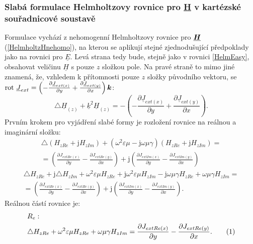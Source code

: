 \documentclass[12pt,a4paper,oneside]{article}
\numberwithin{equation}{section} %
\numberwithin{figure}{section} %
\numberwithin{table}{section} %
\newcommand{\mj}{\mathrm{j}} %
\renewcommand{\vec}[1]{\mbox{\boldmath$#1$}} %
\newcommand{\faz}[1]{{\underline{#1}}} %
\newcommand{\rot}{\mathrm{rot}\ }
\newcommand\numberthis{\addtocounter{equation}{1}\tag{\theequation}}
\begin{document}
\subsubsection{Slabá formulace Helmholtzovy rovnice pro \faz{H} v kartézské souřadnicové soustavě}
Formulace vychází z nehomogenní Helmholtzovy rovnice pro $\faz{\vec{H}}$ (\ref{HelmholtzHnehomo}), na kterou se aplikují stejné zjednodušující předpoklady jako na rovnici pro $\faz{E}$. Levá strana tedy bude, stejně jako v rovnici \ref{HelmEasy}, obsahovat veličinu $\faz{H}$ s pouze $z$ složkou pole. Na pravé straně to mimo jiné znamená, že, vzhledem k přítomnosti pouze $z$ složky původního vektoru, se $\rot \faz{J} _{ext} = \left( - \frac{\partial \faz{J} _{ext(x)}}{\partial y} + \frac{\partial \faz{J} _{ext(y)}}{\partial x} \right) \vec{k}$:
\begin{equation}
\label{HelmEasyH}
\triangle \faz{H} _{(z)} + \faz{k} ^2 \faz{H} _{(z)} = - \left( - \frac{\partial \faz{J} _{ext(x)}}{\partial y} + \frac{\partial \faz{J} _{ext(y)}}{\partial x} \right) .
\end{equation}
Prvním krokem pro vyjádření slabé formy je rozložení rovnice na reálnou a imaginární složku:
\begin{equation}
\begin{split}
\triangle (H _{zRe} + \mj H _{zIm}) + (\omega ^2 \varepsilon \mu - \mj \omega \mu \gamma) (H _{zRe} + \mj H _{zIm}) =\\ 
= \left( \frac{\partial J _{extRe(x)}}{\partial y} - \frac{\partial J _{extRe(y)}}{\partial x} \right) + \mj \left( \frac{\partial J _{extIm(x)}}{\partial y} - \frac{\partial J _{extIm(y)}}{\partial x} \right)
\end{split}
\end{equation}
\begin{equation}
\begin{split}
\triangle H _{zRe} + \mj \triangle H _{zIm} + \omega ^2 \varepsilon \mu H_ {zRe} + \mj \omega ^2 \varepsilon \mu H _{zIm} - \mj \omega \mu \gamma H _{zRe} + \omega \mu \gamma H _{zIm} =\\
= \left( \frac{\partial J _{extRe(x)}}{\partial y} - \frac{\partial J _{extRe(y)}}{\partial x} \right) + \mj \left( \frac{\partial J _{extIm(x)}}{\partial y} - \frac{\partial J _{extIm(y)}}{\partial x} \right) .
\end{split}
\end{equation}
Reálnou částí rovnice je:
\begin{align*}
&R_{e}:
\\
&\triangle H_ {zRe} + \omega ^2 \varepsilon \mu H_ {zRe} + \omega \mu \gamma H _{zIm} = \frac{\partial J _{extRe(x)}}{\partial y} - \frac{\partial J _{extRe(y)}}{\partial x} .
\numberthis
\end{align*}
\end{document}
